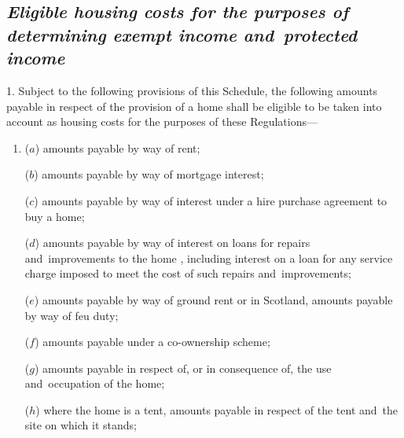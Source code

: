 \documentclass[12pt,a4paper]{article}
\begin{document}
\renewcommand\parthead{--- Schedule 3}

\subsection*{\itshape Eligible housing costs for the purposes of determining exempt income and~protected income}

1.  Subject to the following provisions of this Schedule, 
the following amounts payable  %
in respect of the provision of a home shall be eligible to be taken into account as housing costs for the purposes of these Regulations—
\begin{enumerate}\item[]
($a$) 
amounts payable by way of  %
rent;


($b$) amounts payable by way of mortgage interest;

($c$) 
amounts payable by way of interest  %
under a hire purchase agreement to buy a home;

($d$) 
amounts payable by way of interest  %
on loans for repairs and~improvements to the home%
, including interest on a loan for any service charge imposed to meet the cost of such repairs and~improvements; %

($e$) 
amounts payable  %
by way of ground rent or in Scotland, 
amounts payable  %
by way of feu duty;

($f$) 
amounts payable  %
under a co-ownership scheme;

($g$) 
amounts payable  %
in respect of, or in consequence of, the use and~occupation of the home;

($h$) where the home is a tent, 
amounts payable  %
in respect of the tent and~the site on which it stands;


\end{enumerate}
\end{document}
